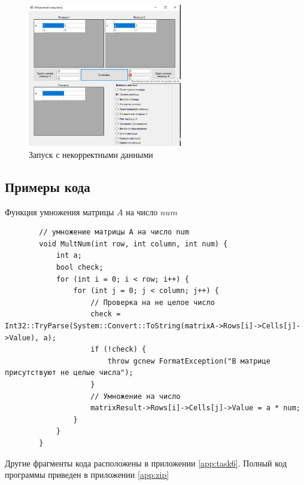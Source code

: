 \begin{figure}[!h]
    \centering
    \includegraphics[width = 0.6\textwidth]{images/Task6/BadInputSumMatrix.png}
    \caption{Запуск с некорректными данными}
    \label{fig:BadInputNotIntForm6}
\end{figure}

\subsection{Примеры кода}

Функция умножения матрицы $A$ на число $num$

\begin{verbatim}
		// умножение матрицы A на число num
		void MultNum(int row, int column, int num) {
			int a;
			bool check;
			for (int i = 0; i < row; i++) {
				for (int j = 0; j < column; j++) {
					// Проверка на не целое число
					check = Int32::TryParse(System::Convert::ToString(matrixA->Rows[i]->Cells[j]->Value), a);
					if (!check) {
						throw gcnew FormatException("В матрице присутствуют не целые числа");
					}
					// Умножение на число
					matrixResult->Rows[i]->Cells[j]->Value = a * num;
				}
			}
		}
\end{verbatim}

Другие фрагменты кода расположены в приложении \ref{app:task6}. Полный код программы приведен в приложении \ref{app:zip}
